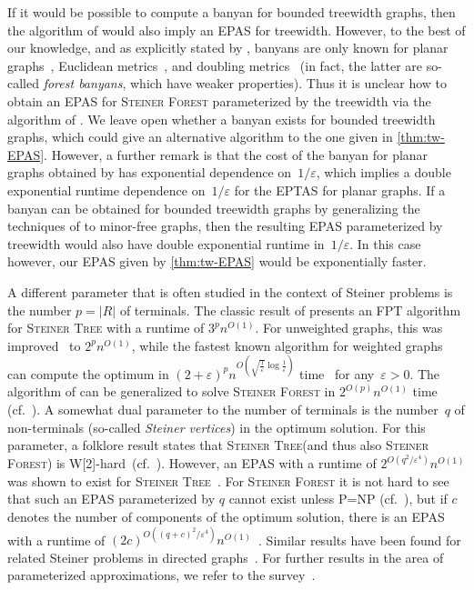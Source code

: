 \documentclass[a4paper]{article}
\let\oldcitet\citet
\renewcommand{\citet}[1]{\mbox{\oldcitet{#1}}}
\theoremstyle{plain}
\newcommand{\eps}{{\varepsilon}}
\newcommand{\pname}[1]{\textsc{#1}}
\newcommand{\SF}{\pname{Steiner Forest}\xspace}
\newcommand{\ST}{\pname{Steiner Tree}\xspace}
\begin{document}
If it would be possible to compute a banyan for bounded treewidth graphs, then the algorithm of \citet{eisenstat2012efficient} would also imply an EPAS for treewidth. However, to the best of our knowledge, and as explicitly stated by \citet{bartal2021near}, banyans are only known for planar graphs~\cite{eisenstat2012efficient, borradaile2009n}, Euclidean metrics~\cite{rao1998approximating}, and doubling metrics~\cite{bartal2021near} (in fact, the latter are so-called \emph{forest banyans}, which have weaker properties). Thus it is unclear how to obtain an EPAS for \SF parameterized by the treewidth via the algorithm of \citet{eisenstat2012efficient}. We leave open whether a banyan exists for bounded treewidth graphs, which could give an alternative algorithm to the one given in \autoref{thm:tw-EPAS}. However, a further remark is that the cost of the banyan for planar graphs obtained by \citet{borradaile2009n} has exponential dependence on~$1/\eps$, which implies a double exponential runtime dependence on~$1/\eps$ for the EPTAS for planar graphs. If a banyan can be obtained for bounded treewidth graphs by generalizing the techniques of \citet{borradaile2009n} to minor-free graphs, then the resulting EPAS parameterized by treewidth would also have double exponential runtime in~$1/\eps$. In this case however, our EPAS given by \autoref{thm:tw-EPAS} would be exponentially faster.

A different parameter that is often studied in the context of Steiner problems 
is the number $p=|R|$ of terminals. The classic result of 
\citet{dreyfus1971steiner} presents an FPT algorithm for \ST with a runtime of 
$3^p n^{O(1)}$. For unweighted graphs, this was 
improved~\cite{bjorklund2007fourier, nederlof2009fast} to $2^p n^{O(1)}$, while 
the fastest known algorithm for weighted graphs can compute the optimum in 
$(2+\eps)^p n^{O(\sqrt{\frac{1}{\eps}}\log\frac{1}{\eps})}$ 
time~\cite{fuchs2007dynamic} for any~$\eps>0$. The algorithm of 
\citet{dreyfus1971steiner} can be generalized to solve \SF in $2^{O(p)} 
n^{O(1)}$ time (cf.~\cite{chitnis2021parameterized}). A somewhat dual parameter 
to the number of terminals is the number~$q$ of non-terminals (so-called 
\emph{Steiner vertices}) in the optimum solution. For this parameter, a folklore 
result states that \ST (and thus also \SF) is 
W[2]-hard~(cf.~\cite{cygan2015parameterized, dvorak2021parameterized}). However, 
an EPAS with a runtime of $2^{O(q^2/\eps^4)}n^{O(1)}$ was shown to exist for 
\ST~\cite{dvorak2021parameterized}. For \SF it is not hard to see that such an 
EPAS parameterized by $q$ cannot exist unless P=NP 
(cf.~\cite{dvorak2021parameterized}), but if $c$ denotes the number of 
components of the optimum solution, there is an EPAS with a runtime of 
$(2c)^{O((q+c)^2/\eps^4)}n^{O(1)}$~\cite{dvorak2021parameterized}. Similar 
results have been found for related Steiner problems in directed 
graphs~\cite{chitnis2021parameterized}. For further results in the area of 
parameterized approximations, we refer to the survey~\cite{feldmann2020survey}.
\end{document}
